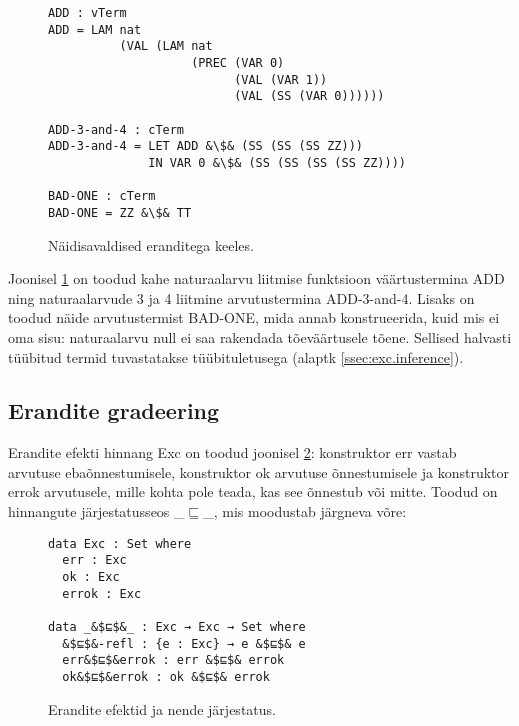 \documentclass[a4paper,12pt]{article}
\begin{document}
\begin{figure}
  \begin{lstlisting}
ADD : vTerm
ADD = LAM nat
          (VAL (LAM nat
                    (PREC (VAR 0)
                          (VAL (VAR 1))
                          (VAL (SS (VAR 0))))))

ADD-3-and-4 : cTerm
ADD-3-and-4 = LET ADD &\$& (SS (SS (SS ZZ)))
              IN VAR 0 &\$& (SS (SS (SS (SS ZZ))))

BAD-ONE : cTerm
BAD-ONE = ZZ &\$& TT
  \end{lstlisting}
  \caption{Näidisavaldised eranditega keeles.}
  \label{fig:exc.raw.ex1}
\end{figure}

Joonisel \ref{fig:exc.raw.ex1} on toodud kahe naturaalarvu liitmise funktsioon väärtustermina ADD
ning naturaalarvude 3 ja 4 liitmine arvutustermina ADD-3-and-4.
Lisaks on toodud näide arvutustermist BAD-ONE, mida annab konstrueerida,
kuid mis ei oma sisu: naturaalarvu null ei saa rakendada tõeväärtusele tõene.
Sellised halvasti tüübitud termid tuvastatakse tüübituletusega (alaptk \ref{ssec:exc.inference}).

\subsection{Erandite gradeering} \label{ssec:exc.grading}

Erandite efekti hinnang Exc on toodud joonisel \ref{fig:exc.exc}: konstruktor err vastab arvutuse ebaõnnestumisele, konstruktor ok arvutuse õnnestumisele ja konstruktor errok arvutusele, mille kohta pole teada, kas see õnnestub või mitte. Toodud on hinnangute järjestatusseos _$⊑$_, mis moodustab järgneva võre:
\begin{center}
\end{center}
\begin{figure}
  \begin{lstlisting}
data Exc : Set where
  err : Exc
  ok : Exc
  errok : Exc
  
data _&$⊑$&_ : Exc → Exc → Set where
  &$⊑$&-refl : {e : Exc} → e &$⊑$& e
  err&$⊑$&errok : err &$⊑$& errok
  ok&$⊑$&errok : ok &$⊑$& errok
  \end{lstlisting}
  \caption{Erandite efektid ja nende järjestatus.}
  \label{fig:exc.exc}
\end{figure}
\end{document}
